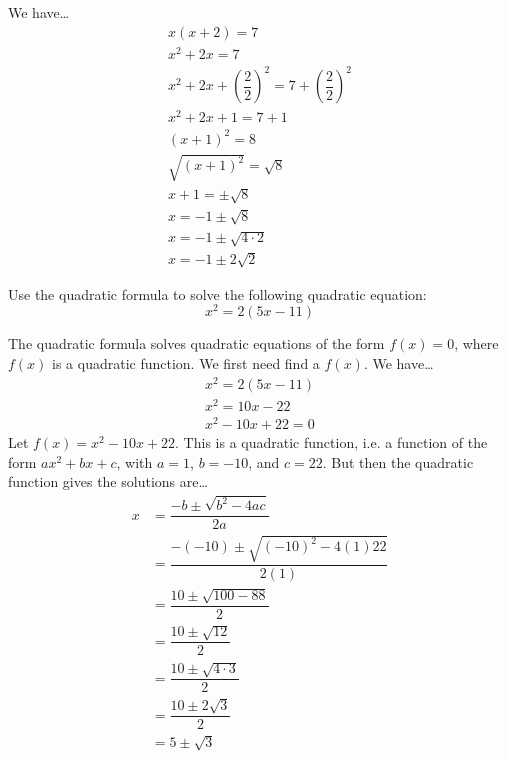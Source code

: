\documentclass[11pt,letterpaper]{article}
\begin{document}
\sol We have\dots
	\[
	\begin{gathered}
	x(x + 2)= 7 \\[0.3cm]
	x^2 + 2x= 7 \\[0.3cm]
	x^2 + 2x + \left( \dfrac{2}{2} \right)^2= 7 + \left( \dfrac{2}{2} \right)^2 \\[0.3cm]
	x^2 + 2x + 1= 7 + 1 \\[0.3cm]
	(x + 1)^2= 8 \\[0.3cm]
	\sqrt{(x + 1)^2}= \sqrt{8} \\[0.3cm]
	x + 1= \pm \sqrt{8} \\[0.3cm]
	x= -1 \pm \sqrt{8} \\[0.3cm]
	x= -1 \pm \sqrt{4 \cdot 2} \\[0.3cm]
	x= -1 \pm 2 \sqrt{2}
	\end{gathered}
	\]



\newpage



 Use the quadratic formula to solve the following quadratic equation:
	\[
	x^2= 2(5x - 11)
	\]

\sol The quadratic formula solves quadratic equations of the form $f(x)= 0$, where $f(x)$ is a quadratic function. We first need find a $f(x)$. We have\dots
	\[
	\begin{gathered}
	x^2= 2(5x - 11) \\[0.3cm]
	x^2= 10x - 22 \\[0.3cm]
	x^2 - 10x + 22= 0 
	\end{gathered}
	\]
Let $f(x)= x^2 - 10x + 22$. This is a quadratic function, i.e. a function of the form $ax^2 + bx + c$, with $a= 1$, $b= -10$, and $c= 22$. But then the quadratic function gives the solutions are\dots
	\[
	\begin{aligned}
	x&= \dfrac{-b \pm \sqrt{b^2 - 4ac}}{2a} \\[0.3cm]
	&= \dfrac{-(-10) \pm \sqrt{(-10)^2 - 4(1)22}}{2(1)} \\[0.3cm]
	&= \dfrac{10 \pm \sqrt{100 - 88}}{2} \\[0.3cm]
	&= \dfrac{10 \pm \sqrt{12}}{2} \\[0.3cm]
	&= \dfrac{10 \pm \sqrt{4 \cdot 3}}{2} \\[0.3cm]
	&= \dfrac{10 \pm 2 \sqrt{3}}{2} \\[0.3cm]
	&= 5 \pm \sqrt{3}
	\end{aligned}
	\]
\end{document}
